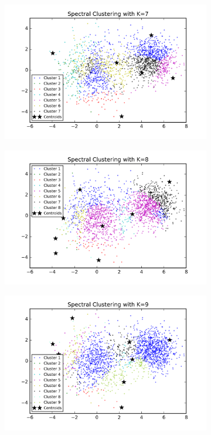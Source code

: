 \begin{description}
\begin{description}
\begin{figure}[!h]
\begin{subfigure}[b]{0.475\textwidth}
            \includegraphics[width=\textwidth]{./figures/clustering_spectral_7.png}
        \end{subfigure}
        \hfill
        \begin{subfigure}[b]{0.475\textwidth}  
            \centering 
            \includegraphics[width=\textwidth]{./figures/clustering_spectral_8.png}
        \end{subfigure}
        \begin{subfigure}[b]{0.475\textwidth}   
            \centering 
            \includegraphics[width=\textwidth]{./figures/clustering_spectral_9.png}

\end{subfigure}
\end{figure}
\end{description}
\end{description}
